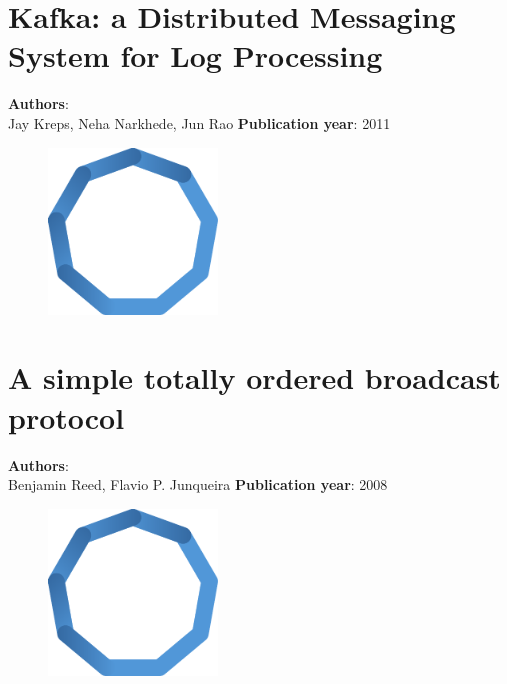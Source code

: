 \documentclass[11pt,fleqn]{book} %
\begin{document}
\chapter{Kafka: a Distributed Messaging System for Log Processing}
\vspace*{-7mm}
\Large \textbf{Authors}: \\
Jay Kreps, Neha Narkhede, Jun Rao
\newline\newline
\textbf{Publication year}: 2011
\begin{figure}[b]
    \centering
    \includegraphics[width=0.4\textwidth]{distributed-systems-blue.pdf}
\end{figure}


\chapter{A simple totally ordered broadcast protocol}
\vspace*{-7mm}
\Large \textbf{Authors}: \\
Benjamin Reed, Flavio P. Junqueira
\newline\newline
\textbf{Publication year}: 2008
\begin{figure}[b]
    \centering
    \includegraphics[width=0.4\textwidth]{distributed-systems-blue.pdf}
\end{figure}

\end{document}
